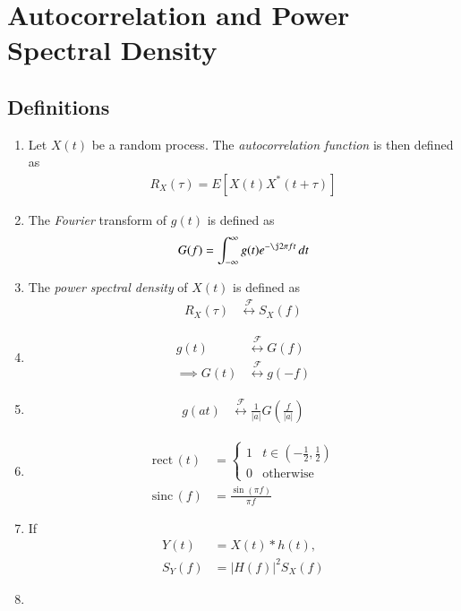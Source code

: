 \documentclass[journal,12pt,onecolumn]{IEEEtran}
\renewcommand\thesection{\arabic{section}}
\renewcommand\thesubsection{\thesection.\arabic{subsection}}
\providecommand{\sbrak}[1]{\ensuremath{{}\left[#1\right]}}
\providecommand{\brak}[1]{\ensuremath{\left(#1\right)}}
\theoremstyle{remark}
\providecommand{\abs}[1]{\left\vert#1\right\vert}
\providecommand{\system}[1]{\overset{\mathcal{#1}}{ \longleftrightarrow}}
\newcommand{\sinc}{\,\text{sinc}\,}
\newcommand{\rect}{\,\text{rect}\,}
\numberwithin{equation}{section}
\begin{document}
 \section{Autocorrelation and Power Spectral Density}
 \subsection{Definitions}
\begin{enumerate}[label=\arabic*.,ref=\thesubsection.\theenumi]
\item Let $X(t)$ be a random process.  The {\em autocorrelation function} is then defined as
	\begin{align}
		R_X\brak{\tau} = E\sbrak{X(t)X^*\brak{t+\tau}}
	\end{align}
\item The {\em Fourier} transform of $g(t)$ is defined as
	\begin{align}
		G(f) = \int_{-\infty}^{\infty}g(t)e^{-\j2\pi f t}\, dt
	\end{align}
\item The {\em power spectral density} of $X(t)$ is defined as
	\begin{align}
		R_X(\tau) &\system{F}	S_X(f) 
	\end{align}
\item 
	\begin{align}
		g(t) &\system{F}	G(f) 
		\\
		\implies G(t) &\system{F} g(-f)
	\end{align}
\item 
	\begin{align}
		g(at) &\system{F}	\frac{1}{\abs{a}}G\brak{\frac{f}{\abs{a}}}
	\end{align}
\item 
	\begin{align}
		\rect(t) &= 
		\begin{cases}
			1 & t \in \brak{-\frac{1}{2}, \frac{1}{2}}
			\\
			0 & \text{otherwise}
		\end{cases}
		\\
		\sinc(f) &= \frac{\sin\brak{\pi f}}{\pi f}
	\end{align}
\item If 
	\begin{align}
		Y(t) &= X(t)*h(t),
		\\
		S_Y(f) &= \abs{H(f)}^2 S_X(f)
	\end{align}
\item 
	\begin{align}

\end{align}
\end{enumerate}
\end{document}
